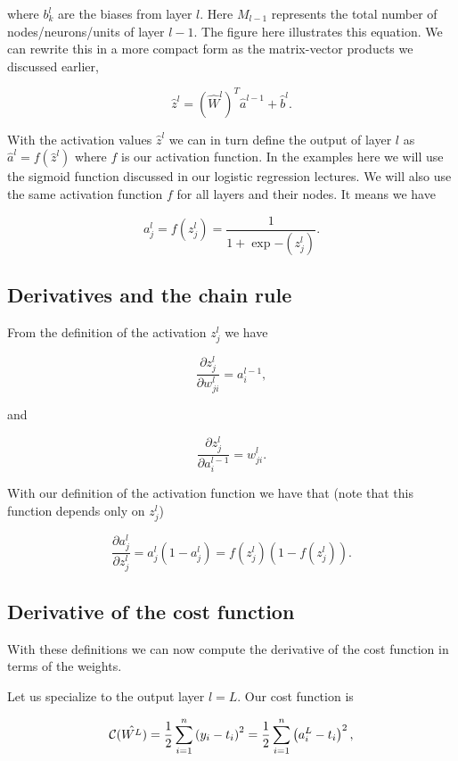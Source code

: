 \documentclass[11pt]{article}
\begin{document}
    where \(b_k^l\) are the biases from layer \(l\). Here \(M_{l-1}\)
represents the total number of nodes/neurons/units of layer \(l-1\). The
figure here illustrates this equation. We can rewrite this in a more
compact form as the matrix-vector products we discussed earlier,

    \[
\hat{z}^l = \left(\hat{W}^l\right)^T\hat{a}^{l-1}+\hat{b}^l.
\]

    With the activation values \(\hat{z}^l\) we can in turn define the
output of layer \(l\) as \(\hat{a}^l = f(\hat{z}^l)\) where \(f\) is our
activation function. In the examples here we will use the sigmoid
function discussed in our logistic regression lectures. We will also use
the same activation function \(f\) for all layers and their nodes. It
means we have

    \[
a_j^l = f(z_j^l) = \frac{1}{1+\exp{-(z_j^l)}}.
\]

    \hypertarget{derivatives-and-the-chain-rule}{%
\subsection{Derivatives and the chain
rule}\label{derivatives-and-the-chain-rule}}

From the definition of the activation \(z_j^l\) we have

    \[
\frac{\partial z_j^l}{\partial w_{ji}^l} = a_i^{l-1},
\]

    and

    \[
\frac{\partial z_j^l}{\partial a_i^{l-1}} = w_{ji}^l.
\]

    With our definition of the activation function we have that (note that
this function depends only on \(z_j^l\))

    \[
\frac{\partial a_j^l}{\partial z_j^{l}} = a_j^l(1-a_j^l)=f(z_j^l)(1-f(z_j^l)).
\]

    \hypertarget{derivative-of-the-cost-function}{%
\subsection{Derivative of the cost
function}\label{derivative-of-the-cost-function}}

With these definitions we can now compute the derivative of the cost
function in terms of the weights.

Let us specialize to the output layer \(l=L\). Our cost function is

    \[
{\cal C}(\hat{W^L})  =  \frac{1}{2}\sum_{i=1}^n\left(y_i - t_i\right)^2=\frac{1}{2}\sum_{i=1}^n\left(a_i^L - t_i\right)^2,
\]
\end{document}

